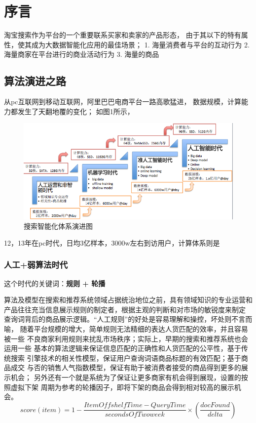
\chapter{序言}
\thispagestyle{empty}

\setlength{\fboxrule}{0pt}\setlength{\fboxsep}{0cm}
\noindent\shadowbox{
\begin{tcolorbox}[arc=0mm,colback=lightblue,colframe=darkblue,title=学习目标与要求]

\end{tcolorbox}}
\setlength{\fboxrule}{1pt}\setlength{\fboxsep}{4pt}

淘宝搜索作为平台的一个重要联系买家和卖家的产品形态， 
由于其以下的特有属性，使其成为大数据智能化应用的最佳场景；
1. 海量消费者与平台的互动行为
2. 海量商家在平台进行的商业活动行为
3. 海量的商品

\section{算法演进之路}

从pc互联网到移动互联网，阿里巴巴电商平台一路高歌猛进，
数据规模，计算能力都发生了天翻地覆的变化；
如图1所示，
\begin{figure}[h]
\centering
\includegraphics[totalheight=2.0in]{fig/searchAlgoRoadmap.png}
\caption{搜索智能化体系演进图} \label{fig:gansamples}
\end{figure}
12，13年在pc时代，日均3亿样本，3000w左右到访用户，计算体系则是



\subsection{人工+弱算法时代} 
这个时代的关键词：\textbf{规则 + 轮播}

算法及模型在搜索和推荐系统领域占据统治地位之前，具有领域知识的专业运营和
产品往往充当信息展示规则的制定者，根据主观的判断和对市场的敏锐度来制定
查询词背后的商品展示逻辑。“人工规则”的好处是容易理解和操控，坏处则不言而喻，
随着平台规模的增大，简单规则无法精细的表达人货匹配的效率，并且容易被一些
不良商家利用规则来扰乱市场秩序；实际上，早期的搜索和推荐系统也会运用一些
基本的算法逻辑来保证信息匹配的正确性和人货匹配的公平性，基于传统搜索
引擎技术的相关性模型，保证用户查询词语商品标题的有效匹配；基于商品成交
与否的销售人气指数模型，保证有助于被消费者接受的商品得到更多的展示机会；
另外还有一个就是系统为了保证让更多商家有机会得到展现，设置的按照虚拟下架
周期为参考的轮播因子，即将下架的商品会得到相对较高的展示机会。
$$
	score(item)=1-\frac{ItemOffshelfTime-QueryTime}{secondsOfTwoweek}\times(\frac{docFound}{delta})
$$

